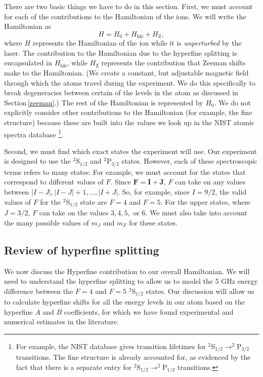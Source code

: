 There are two basic things we have to do in this section. First, we must account for each of the contributions to the Hamiltonian of the ions. We will write the Hamiltonian as 
\begin{equation}
H=H_0+H_{\mathrm{hfs}}+H_{\mathrm{Z}},\label{Hoverall}
\end{equation}
where $H$ represents the Hamiltonian of the ion while it is \emph{unperturbed} by the laser. The contribution to the Hamiltonian due to the hyperfine splitting is encapsulated in $H_{\mathrm{hfs}}$, while $H_{\mathrm{Z}}$ represents the contribution that Zeeman shifts make to the Hamiltonian. (We create a constant, but adjustable magnetic field through which the atoms travel during the experiment. We do this specifically to break degeneracies between certain of the levels in the atom as discussed in Section\,\ref{zeeman}.) The rest of the Hamiltonian is represented by $H_0$. We do not explicitly consider other contributions to the Hamiltonian (for example, the fine structure) because these are built into the values we look up in the NIST atomic spectra database \cite{NISTasd}\footnote{For example, the NIST database gives transition lifetimes for $^2$S$_{1/2}\rightarrow^2$P$_{3/2}$ transitions. The fine structure is already accounted for, as evidenced by the fact that there is a separate entry for $^2$S$_{1/2}\rightarrow^2$P$_{1/2}$ transitions.}.

Second, we must find which exact states the experiment will use.
Our experiment is designed to use the $^2$S$_{1/2}$ and $^2$P$_{3/2}$ states. However, each of these spectroscopic terms refers to many states: For example, we must account for the states that correspond to different values of $F$. Since $\mathbf{F}=\mathbf{I}+\mathbf{J}$, $F$ can take on any values between $|I-J|,|I-J|+1,...,|I+J|$. So, for example, since $I=9/2$, the valid values of $F$ for the $^2$S$_{1/2}$ state are $F=4$ and $F=5$. For the upper states, where $J=3/2$, $F$ can take on the values $3,4,5,$ or $6$. We must also take into account the many possible values of $m_J$ and $m_F$ for these states.

\subsection{Review of hyperfine splitting}

We now discuss the Hyperfine contribution to our overall Hamiltonian. We will need to understand the hyperfine splitting to allow us to model the 5 GHz energy difference between the $F=4$ and $F=5$ $^2$S$_{1/2}$ states. Our discussion will allow us to calculate hyperfine shifts for all the energy levels in our atom based on the hyperfine $A$ and $B$ coefficients, for which we have found experimental and numerical estimates in the literature.


